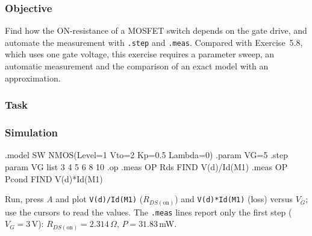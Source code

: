 
\subsubsection*{Objective}
Find how the ON-resistance of a MOSFET switch depends on the gate drive, and automate the measurement with
\texttt{.step} and \texttt{.meas}. Compared with Exercise~5.8, which uses one gate voltage, this exercise requires a parameter
sweep, an automatic measurement and the comparison of an exact model with an approximation.

\subsubsection*{Task}

\subsubsection*{Simulation}
\begin{spice}
.model SW NMOS(Level=1 Vto=2 Kp=0.5 Lambda=0)
.param VG=5
.step param VG list 3 4 5 6 8 10
.op
.meas OP Rds FIND V(d)/Id(M1)
.meas OP Pcond FIND V(d)*Id(M1)
\end{spice}
Run, press \textit{A} and plot \texttt{V(d)/Id(M1)} ($R_{DS(\mathrm{on})}$) and \texttt{V(d)*Id(M1)} (loss) versus $V_G$; use the cursors to read the values. The \texttt{.meas} lines report only the first step ($V_G=3$\,V): $R_{DS(\mathrm{on})}=2.314\,\Omega$, $P=31.83$\,mW.

